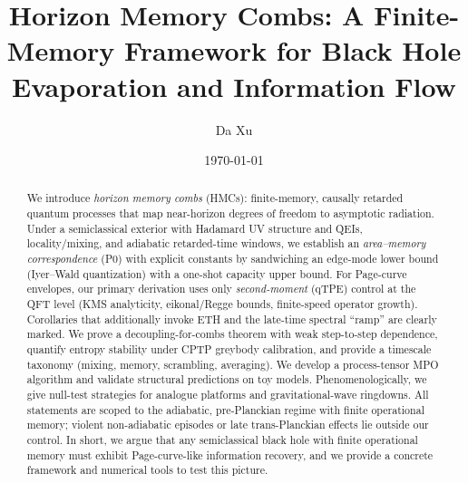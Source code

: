 \documentclass[aps,prd,preprint,onecolumn,superscriptaddress,nofootinbib,longbibliography,floatfix,11pt,showpacs,showkeys]{revtex4-2}
\newcounter{algorithm}
\theoremstyle{plain}
\theoremstyle{definition}
\theoremstyle{remark}
\begin{document}
\title{Horizon Memory Combs: A Finite-Memory Framework for Black Hole Evaporation and Information Flow}

\author{Da Xu}

\date{\today}

\begin{abstract}
We introduce \emph{horizon memory combs} (HMCs): finite-memory, causally
retarded quantum processes that map near-horizon degrees of freedom to asymptotic
radiation. Under a semiclassical exterior with Hadamard UV structure and QEIs,
locality/mixing, and adiabatic retarded-time windows, we establish an
\emph{area--memory correspondence} (P0) with explicit constants by sandwiching an
edge-mode lower bound (Iyer--Wald quantization) with a one-shot capacity upper bound.
For Page-curve envelopes, our primary derivation uses only \emph{second-moment} (qTPE)
control at the QFT level (KMS analyticity, eikonal/Regge bounds, finite-speed operator
growth). Corollaries that additionally invoke ETH and the late-time spectral ``ramp''
are clearly marked. We prove a decoupling-for-combs theorem with weak step-to-step
dependence, quantify entropy stability under CPTP greybody calibration, and provide a
timescale taxonomy (mixing, memory, scrambling, averaging). We develop a process-tensor
MPO algorithm and validate structural predictions on toy models. Phenomenologically,
we give null-test strategies for analogue platforms and gravitational-wave ringdowns.
All statements are scoped to the adiabatic, pre-Planckian regime with finite operational
memory; violent non-adiabatic episodes or late trans-Planckian effects lie outside our control.
In short, we argue that any semiclassical black hole with finite operational memory must exhibit Page-curve-like information recovery, and we provide a concrete framework and numerical tools to test this picture.
\end{abstract}


\maketitle
\end{document}
